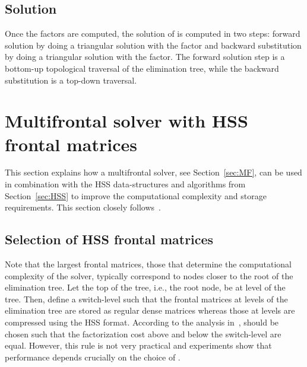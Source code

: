 \documentclass{article}
\newcommand{\ignore}[1]{}
\begin{document}
\ignore{ In the multifrontal factorization, the active memory, i.e., the memory
in use at a given step in the factorization, consists of the frontal
matrix being processed and a set of contribution blocks that are
temporarily stored and will be consumed at a later step.  The
multifrontal method lends itself very naturally to parallelism since
multiple processes can be employed to treat one, large enough, frontal
matrix or to process concurrently frontal matrices belonging to
separate subtrees.  These two sources of parallelism are commonly
referred to as node and tree parallelism, respectively, and their
correct exploitation is the key to achieving high performance on
parallel architectures.
}

\subsection{Solution}
Once the factors are computed, the solution  of  is
computed in two steps: forward solution by doing a triangular solution
with the  factor and backward substitution by doing a triangular
solution with the  factor. The forward solution step is a bottom-up
topological traversal of the elimination tree, while the backward
substitution is a top-down traversal.


\section{Multifrontal solver with HSS frontal matrices}\label{sec:MFHSS}
This section explains how a multifrontal solver, see
Section~\ref{sec:MF}, can be used in combination with the HSS
data-structures and algorithms from Section~\ref{sec:HSS} to improve
the computational complexity and storage requirements. This section
closely follows~\cite{xia2013randomized}.

\subsection{Selection of HSS frontal matrices}
Note that the largest frontal matrices, those that determine the
computational complexity of the solver, typically correspond to nodes
closer to the root of the elimination tree. Let the top of the tree,
i.e., the root node, be at level  of the tree. Then, define a
switch-level  such that the frontal matrices at levels  of the elimination tree are stored as regular dense
matrices whereas those at levels  are compressed using
the HSS format. According to the analysis in~\cite{xia2013randomized},
 should be chosen such that the factorization cost above and
below the switch-level are equal. However, this rule is not very
practical and experiments show that performance depends crucially on
the choice of .
\end{document}

